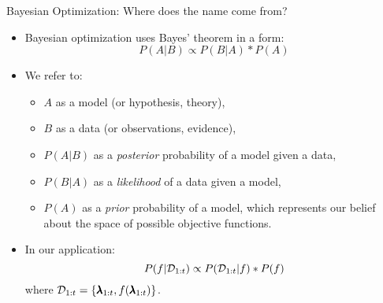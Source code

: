 \begin{frame}[c]{Bayesian Optimization: Where does the name come from?}

\begin{itemize}
    \item Bayesian optimization uses Bayes' theorem in a form: 
    	\begin{equation*}
    	    P(A \vert B) \propto P(B \vert A) * P(A)
    	\end{equation*} \pause
    \item We refer to:
        \begin{itemize}
            \item $A$ as a model (or hypothesis, theory), \pause
            \item $B$ as a data (or observations, evidence),\pause
            \item $P(A \vert B)$ as a \emph{posterior} probability of a model given a data,\pause
            \item $P(B \vert A)$ as a \emph{likelihood} of a data given a model, \pause
            \item $P(A)$ as a \emph{prior} probability of a model, which represents our belief about the space of possible objective functions. \pause
        \end{itemize}
    \item In our application:
        \begin{equation*}
            P(f \vert \mathcal{D}_{1:t}) \propto P(\mathcal{D}_{1:t} \vert f) * P(f)
        \end{equation*} \pause
        where $\mathcal{D}_{1:t} = \left \{ \pmb{\lambda}_{1:t}, f(\pmb{\lambda}_{1:t}) \right \}$.

\end{itemize}

        
\end{frame}

